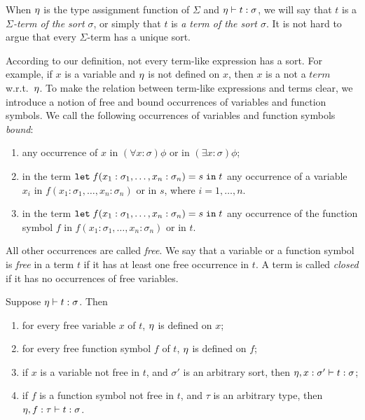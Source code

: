 When $\eta$ is the type assignment function of $\Sigma$ and $\eta \vdash t : \sigma$, we will say that $t$ is a \emph{$\Sigma$-term of the sort $\sigma$}, or simply that $t$ is \emph{a term of the sort $\sigma$}. It is not hard to argue that every $\Sigma$-term has a unique sort.

According to our definition, not every term-like expression has a sort. For example, if $x$ is a variable and $\eta$ is not defined on $x$, then $x$ is a not a $term$ w.r.t.\ $\eta$. To make the relation between term-like expressions and terms clear, we introduce a notion of free and bound occurrences of variables and function symbols. We call the following occurrences of variables and function symbols \emph{bound}:

\begin{enumerate}
\item any occurrence of $x$ in $(\forall x:\sigma) \phi$ or in $(\exists x:\sigma) \phi$;
\item in the term $\mathtt{let}\;{f(x_1:\sigma_1, \ldots, x_n:\sigma_n)}={s}\;\allowbreak\mathtt{in}\;{t}$ any occurrence of a variable $x_i$ in $f(x_1:\sigma_1, \ldots, x_n:\sigma_n)$ or in $s$, where $i = 1,\ldots, n$.
\item in the term $\mathtt{let}\;{f(x_1:\sigma_1, \ldots, x_n:\sigma_n)}={s}\;\allowbreak\mathtt{in}\;{t}$ any occurrence of the function symbol $f$ in $f(x_1:\sigma_1, \ldots, x_n:\sigma_n)$ or in $t$.
\end{enumerate}
All other occurrences are called \emph{free}. We say that a variable or a function symbol is \emph{free} in a term $t$ if it has at least one free occurrence in $t$. A term is called \emph{closed} if it has no occurrences of free variables.

\begin{theorem}
  Suppose $\eta \vdash t : \sigma$. Then
  \begin{enumerate}
    \item for every free variable $x$ of $t$, $\eta$ is defined on $x$;
    \item for every free function symbol $f$ of $t$, $\eta$ is defined on $f$;
    \item if $x$ is a variable not free in $t$, and $\sigma'$ is an arbitrary sort, then
      $\eta, x : \sigma' \vdash t : \sigma$;
    \item if $f$ is a function symbol not free in $t$, and $\tau$ is an arbitrary type, then $\eta, f : \tau \vdash t : \sigma$. \QED
  \end{enumerate}
\end{theorem}

